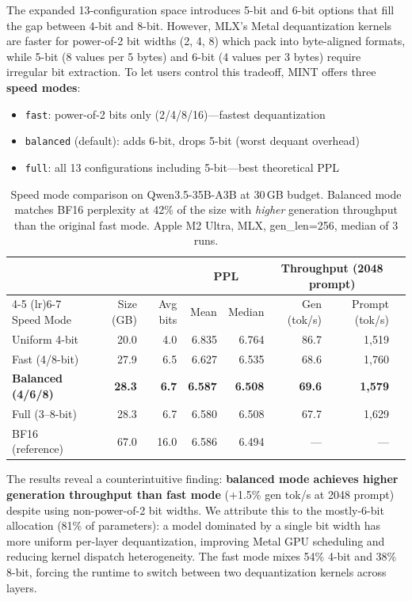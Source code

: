 \documentclass{article}
\begin{document}
The expanded 13-configuration space introduces 5-bit and 6-bit options that fill the gap between 4-bit and 8-bit. However, MLX's Metal dequantization kernels are faster for power-of-2 bit widths (2, 4, 8) which pack into byte-aligned formats, while 5-bit (8 values per 5 bytes) and 6-bit (4 values per 3 bytes) require irregular bit extraction. To let users control this tradeoff, MINT offers three \textbf{speed modes}:

\begin{itemize}
    \item \texttt{fast}: power-of-2 bits only (2/4/8/16)---fastest dequantization
    \item \texttt{balanced} (default): adds 6-bit, drops 5-bit (worst dequant overhead)
    \item \texttt{full}: all 13 configurations including 5-bit---best theoretical PPL
\end{itemize}

\begin{table}[h]
\centering
\caption{Speed mode comparison on Qwen3.5-35B-A3B at 30\,GB budget. Balanced mode matches BF16 perplexity at 42\% of the size with \emph{higher} generation throughput than the original fast mode. Apple M2 Ultra, MLX, gen\_len=256, median of 3 runs.}
\label{tab:speed_modes}
\begin{tabular}{lrrrrrrr}
\toprule
 & & & \multicolumn{2}{c}{PPL} & \multicolumn{2}{c}{Throughput (2048 prompt)} \\
\cmidrule(lr){4-5} \cmidrule(lr){6-7}
Speed Mode & Size (GB) & Avg bits & Mean & Median & Gen (tok/s) & Prompt (tok/s) \\
\midrule
Uniform 4-bit & 20.0 & 4.0 & 6.835 & 6.764 & 86.7 & 1{,}519 \\
Fast (4/8-bit) & 27.9 & 6.5 & 6.627 & 6.535 & 68.6 & 1{,}760 \\
\textbf{Balanced (4/6/8)} & \textbf{28.3} & \textbf{6.7} & \textbf{6.587} & \textbf{6.508} & \textbf{69.6} & \textbf{1{,}579} \\
Full (3--8-bit) & 28.3 & 6.7 & 6.580 & 6.508 & 67.7 & 1{,}629 \\
BF16 (reference) & 67.0 & 16.0 & 6.586 & 6.494 & --- & --- \\
\bottomrule
\end{tabular}
\end{table}

The results reveal a counterintuitive finding: \textbf{balanced mode achieves higher generation throughput than fast mode} (+1.5\% gen tok/s at 2048 prompt) despite using non-power-of-2 bit widths. We attribute this to the mostly-6-bit allocation (81\% of parameters): a model dominated by a single bit width has more uniform per-layer dequantization, improving Metal GPU scheduling and reducing kernel dispatch heterogeneity. The fast mode mixes 54\% 4-bit and 38\% 8-bit, forcing the runtime to switch between two dequantization kernels across layers.
\end{document}
